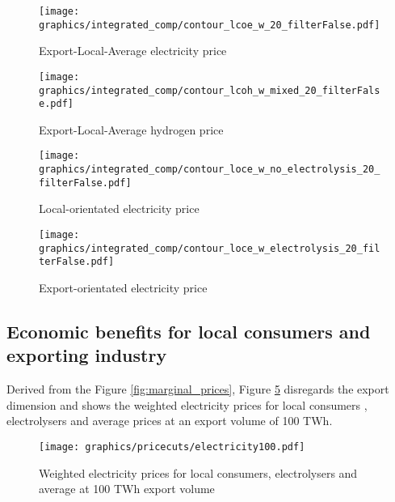 \begin{figure*}[t] %
    \centering
    \begin{subfigure}[b]{0.45\linewidth}
        \centering
        \texttt{[image: graphics/integrated\_comp/contour\_lcoe\_w\_20\_filterFalse.pdf]}
        \caption{Export-Local-Average electricity price}
        \label{fig:export_local_el_price}
    \end{subfigure}
    \hfill
    \begin{subfigure}[b]{0.45\linewidth}
        \centering
        \texttt{[image: graphics/integrated\_comp/contour\_lcoh\_w\_mixed\_20\_filterFalse.pdf]}
        \caption{Export-Local-Average hydrogen price}
        \label{fig:export_local_hy_price}
    \end{subfigure}
    \hfill
    \begin{subfigure}[b]{0.45\linewidth}
        \centering
        \texttt{[image: graphics/integrated\_comp/contour\_loce\_w\_no\_electrolysis\_20\_filterFalse.pdf]}
        \caption{Local-orientated electricity price}
        \label{fig:local_el_price}
    \end{subfigure}
    \hfill
    \begin{subfigure}[b]{0.45\linewidth}
        \centering
        \texttt{[image: graphics/integrated\_comp/contour\_loce\_w\_electrolysis\_20\_filterFalse.pdf]}
        \caption{Export-orientated electricity price}
        \label{fig:export_el_price}
    \end{subfigure}
    \hfill

    \caption{Marginal prices of electricity and hydrogen subject to export volumes and emission limits depending on various weightings. Black lines indicate the lowest price at each emission limit.}
    \label{fig:marginal_prices}
\end{figure*}


\subsection{Economic benefits for local consumers and exporting industry}
\label{subsec:economic_benefits}
Derived from the Figure \ref{fig:marginal_prices}, Figure \ref{fig:pricecut} disregards the export dimension and shows the weighted electricity prices for local consumers , electrolysers and average prices at an export volume of 100 TWh.



\begin{figure}[h!]
    \centering
    \texttt{[image: graphics/pricecuts/electricity100.pdf]}
    \caption{Weighted electricity prices for local consumers, electrolysers and average at 100 TWh export volume}
    \label{fig:pricecut}
\end{figure}



